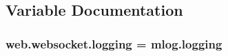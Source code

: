 \subsection{Variable Documentation}
\hypertarget{namespaceweb_1_1websocket_a49bb241e032eee732a261c8c8a9cdfe3}{
\subsubsection[{logging}]{\setlength{\rightskip}{0pt plus 5cm}web.\-websocket.\-logging = mlog.\-logging}}\label{namespaceweb_1_1websocket_a49bb241e032eee732a261c8c8a9cdfe3}

